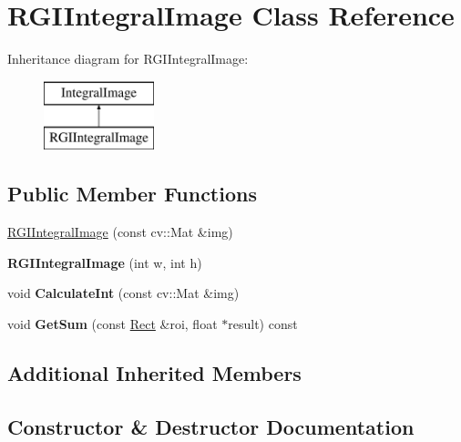 \hypertarget{classRGIIntegralImage}{}\section{R\+G\+I\+Integral\+Image Class Reference}
\label{classRGIIntegralImage}
Inheritance diagram for R\+G\+I\+Integral\+Image\+:\begin{figure}[H]
\begin{center}
\leavevmode
\includegraphics[height=2.000000cm]{classRGIIntegralImage}
\end{center}
\end{figure}
\subsection*{Public Member Functions}
\begin{DoxyCompactItemize}
\item 
\hyperlink{classRGIIntegralImage_ab1974df4946fd93d55ada1a09e91945e}{R\+G\+I\+Integral\+Image} (const cv\+::\+Mat \&img)
\item 
\hypertarget{classRGIIntegralImage_ac98031658bec86c125687fdaf91c8ecd}{}{\bfseries R\+G\+I\+Integral\+Image} (int w, int h)\label{classRGIIntegralImage_ac98031658bec86c125687fdaf91c8ecd}

\item 
\hypertarget{classRGIIntegralImage_a72924e4bd0b101b8b3a38202641b3ba3}{}void {\bfseries Calculate\+Int} (const cv\+::\+Mat \&img)\label{classRGIIntegralImage_a72924e4bd0b101b8b3a38202641b3ba3}

\item 
\hypertarget{classRGIIntegralImage_aad51158989b50545304e4db71144c49a}{}void {\bfseries Get\+Sum} (const \hyperlink{classRect}{Rect} \&roi, float $\ast$result) const \label{classRGIIntegralImage_aad51158989b50545304e4db71144c49a}

\end{DoxyCompactItemize}
\subsection*{Additional Inherited Members}


\subsection{Constructor \& Destructor Documentation}
\hypertarget{classRGIIntegralImage_ab1974df4946fd93d55ada1a09e91945e}{}

